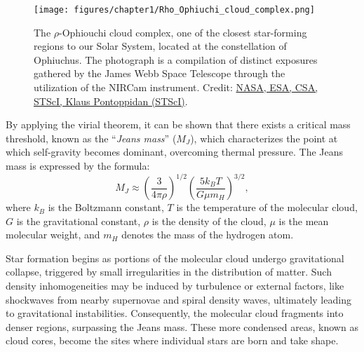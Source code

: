 \documentclass[main.tex]{subfiles}
\begin{document}
    \begin{figure}[t]
        \centering
        \texttt{[image: figures/chapter1/Rho\_Ophiuchi\_cloud\_complex.png]}
        \caption{The $\rho$-Ophiouchi cloud complex, one of the closest star-forming regions to our Solar System, located at the constellation of Ophiuchus. The photograph is a compilation of distinct exposures gathered by the James Webb Space Telescope through the utilization of the NIRCam instrument. Credit: \href{https://webbtelescope.org/contents/media/images/2023/128/01H449193V5Q4Q6GFBKXAZ3S03}{NASA, ESA, CSA, STScI, Klaus Pontoppidan (STScI)}.}
        \label{fig:rho_ophiouchi}
    \end{figure}

    By applying the virial theorem, it can be shown that there exists a critical mass threshold, known as the ``\textit{Jeans mass}'' ($M_J$), which characterizes the point at which self-gravity becomes dominant, overcoming thermal pressure. The Jeans mass is expressed by the formula:
    \begin{equation}\label{eq:jeans_mass}
        M_J \approx \left(\frac{3}{4\pi \rho}\right)^{1/2} \left(\frac{5k_BT}{G\mu m_H }\right)^{3/2}, 
    \end{equation}
    where $k_B$ is the Boltzmann constant, $T$ is the temperature of the molecular cloud, $G$ is the gravitational constant, $\rho$ is the density of the cloud, $\mu$ is the mean molecular weight, and $m_H$ denotes the mass of the hydrogen atom.

    Star formation begins as portions of the molecular cloud undergo gravitational collapse, triggered by small irregularities in the distribution of matter. Such density inhomogeneities may be induced by turbulence or external factors, like shockwaves from nearby supernovae and spiral density waves, ultimately leading to gravitational instabilities. Consequently, the molecular cloud fragments into denser regions, surpassing the Jeans mass. These more condensed areas, known as cloud cores, become the sites where individual stars are born and take shape.
\end{document}
